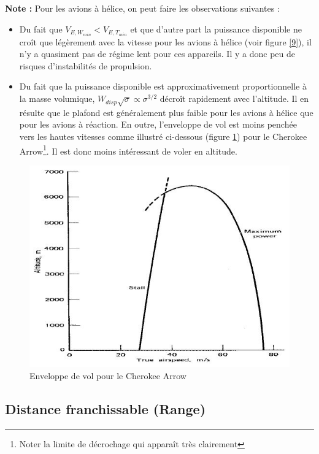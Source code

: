\documentclass{report}
\begin{document}
\textbf{Note :} Pour les avions à hélice, on peut faire les observations suivantes :
\begin{itemize}
    \item Du fait que $V_{E,W_{min}}<V_{E,T_{min}}$ et que d'autre part la puissance disponible ne croît que légèrement avec la vitesse pour les avions à hélice (voir figure \ref{9}), il n'y a quasiment pas de régime lent pour ces appareils. Il y a donc peu de risques d'instabilités de propulsion.
    \item Du fait que la puissance disponible est approximativement proportionnelle à la masse volumique, $W_{disp}\sqrt{\sigma}\propto\sigma^{3/2}$ décroît rapidement avec l’altitude. Il en résulte que le plafond est généralement plus faible pour les avions à hélice que pour les avions à réaction. En outre, l’enveloppe de vol est moins penchée vers les hautes vitesses comme illustré ci-dessous (figure \ref{11}) pour le Cherokee Arrow\footnote{Noter la limite de décrochage qui apparaît très clairement}. Il est donc moins intéressant de voler en altitude.
\end{itemize}

\begin{figure}[h!]
    \centering
    \includegraphics[scale=0.8]{11.JPG}
    \caption{Enveloppe de vol pour le Cherokee Arrow}
    \label{11}
\end{figure}

\subsection{Distance franchissable (Range)}
\end{document}
